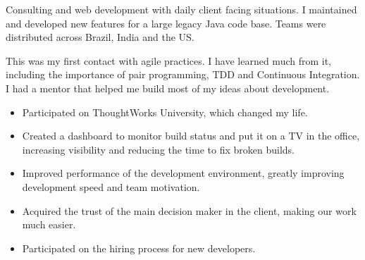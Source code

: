 \documentclass[10pt,a4paper,ragged2e,withhyper]{altacv}
\begin{document}
\begin{paracol}{2}
\divider


{\RaggedRight
Consulting and web development with daily client facing situations. I maintained and developed new features for a large legacy Java code base. Teams were distributed across Brazil, India and the US.

\medskip

This was my first contact with agile practices. I have learned much from it, including the importance of pair programming, TDD and Continuous Integration. I had a mentor that helped me build most of my ideas about development.

\medskip

\begin{itemize}
\item Participated on ThoughtWorks University, which changed my life.
\item Created a dashboard to monitor build status and put it on a TV in the office, increasing visibility and reducing the time to fix broken builds.
\item Improved performance of the development environment, greatly improving development speed and team motivation.
\item Acquired the trust of the main decision maker in the client, making our work much easier.
\item Participated on the hiring process for new developers.
\end{itemize}
}







\end{paracol}
\end{document}
